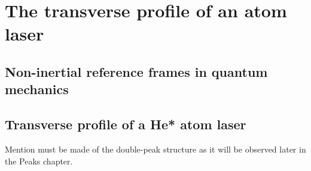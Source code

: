 \chapter{The transverse profile of an atom laser}
\label{TransverseProfile}
\graphicspath{{Figures/TransverseProfile/}{Figures/Common/}}

\section{Non-inertial reference frames in quantum mechanics}
\label{TransverseProfile:DropGP}

\section{Transverse profile of a He* atom laser}
\label{TransverseProfile:Helium}

Mention must be made of the double-peak structure as it will be observed later in the Peaks chapter.